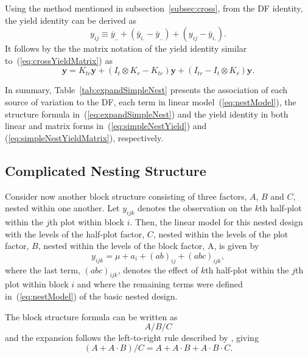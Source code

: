 \documentclass[11pt,a4paper]{article}
\begin{document}
Using the method mentioned in subsection~\ref{subsec:cross}, from the DF identity, the yield identity can be derived as
\begin{equation}\label{eq:simpleNestYield}
y_{ij} \equiv \bar{y}_{..} + (\bar{y}_{i.} - \bar{y}_{..}) + (y_{ij} - \bar{y}_{i.}).
\end{equation}
It follows by the the matrix notation of the yield identity similar to~(\ref{eq:crossYieldMatrix}) as 
\begin{equation}\label{eq:simpleNestYieldMatrix}
\bm{y} = K_{tr}\bm{y} + (I_{t} \otimes K_{r} - K_{tr})\bm{y} + (I_{tr} - I_{t} \otimes K_{r})\bm{y}.
\end{equation}

In summary, Table~\ref{tab:expandSimpleNest} presents the association of each source of variation to the DF, each term in linear model~(\ref{eq:nestModel}), the structure formula in~(\ref{eq:expandSimpleNest}) and the yield identity in both linear and matrix forms in~(\ref{eq:simpleNestYield}) and (\ref{eq:simpleNestYieldMatrix}), respectively.



\subsection{Complicated Nesting Structure}
Consider now another block structure consisting of three factors, $A$, $B$ and $C$, nested within one another. Let $y_{ijk}$ denotes the observation on the $k$th half-plot within the $j$th plot within block $i$. Then, the linear model for this nested design with the levels of the half-plot factor, $C$, nested within the levels of the plot factor, $B$, nested within the levels of the block factor, A, is given by
\begin{equation}\label{eq:complexNestModel}
y_{ijk}= \mu + a_{i} + (ab)_{ij} + (abc)_{ijk},
\end{equation}
where the last term, $(abc)_{ijk}$, denotes the effect of $k$th half-plot within the $j$th plot within block $i$ and where the remaining terms were defined in~(\ref{eq:nestModel}) of the basic nested design.

The block structure formula can be written as
\begin{equation}\label{eq:complexNest2}
A/B/C
\end{equation}
and the expansion follows the left-to-right rule described by \cite{Wilkinson1973}, giving
\begin{equation}\label{eq:expandComplexNest2}
(A + A\cdot B)/C = A + A\cdot B + A\cdot B\cdot C.
\end{equation}
\end{document}

